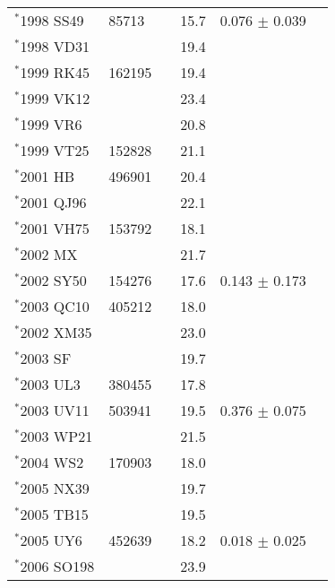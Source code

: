 \documentclass[letters,a4paper,fleqn,usenatbib]{mnras}
\begin{document}
\begin{table*}
{\begin{tabular}{llllll}
  $^*$1998 SS49 & 85713   &     &  15.7   & 0.076 $\pm$ 0.039 & \cite{Tubiana2015} \\ 
  $^*$1998 VD31 &         &     &  19.4   &    & \cite{Babadzhanov2008} \\
  $^*$1999 RK45 & 162195  &     & 19.4    &    & \cite{Porubcan2006,Tubiana2015} \\
  $^*$1999 VK12 &         &     &  23.4   &    & \cite{Babadzhanov2008} \\
  $^*$1999 VR6  &         &     &  20.8   &    & \cite{Babadzhanov2008} \\
  $^*$1999 VT25 & 152828  &     &  21.1   &    & \cite{Tubiana2015} \\
  $^*$2001 HB   & 496901  &     &  20.4   &    & \cite{Porubcan2006} \\
  $^*$2001 QJ96 &         &     &   22.1  &    & \cite{Porubcan2006,Brown2010} \\
  $^*$2001 VH75 & 153792  &     &  18.1   &    & \cite{Jenniskens2006,Tubiana2015} \\
  $^*$2002 MX   &         &     &  21.7   &    & \cite{Jopek2011} \\
  $^*$2002 SY50 & 154276  &     &  17.6   & 0.143 $\pm$ 0.173 & \cite{Tubiana2015} \\
  $^*$2003 QC10 & 405212  &     &  18.0   &    & \cite{Porubcan2006,Tubiana2015} \\
  $^*$2002 XM35 &         &     &  23.0   &    & \cite{Porubcan2006} \\
  $^*$2003 SF   &         &     & 19.7    &    & \cite{Porubcan2006} \\
  $^*$2003 UL3  & 380455  &     & 17.8    &    & \cite{Porubcan2006,Babadzhanov2008,Tubiana2015} \\
  $^*$2003 UV11 & 503941  &     & 19.5    & 0.376 $\pm$ 0.075 & \cite{Jopek2011,Dumitru2017} \\
  $^*$2003 WP21 &         &     & 21.5    &    & \cite{Porubcan2006,Babadzhanov2008,Jopek2011} \\
  $^*$2004 WS2  & 170903  &     & 18.0    &    & \cite{Tubiana2015} \\
  $^*$2005 NX39 &         &     & 19.7    &    & \cite{Jopek2011} \\
  $^*$2005 TB15 &         &     & 19.5    &    & \cite{Jopek2011} \\
  $^*$2005 UY6  & 452639  &     & 18.2    & 0.018 $\pm$ 0.025 & \cite{Jopek2011} \\
  $^*$2006 SO198 &        &     & 23.9    &    & \cite{Jopek2011} \\

\end{tabular}}
\end{table*}
\end{document}
